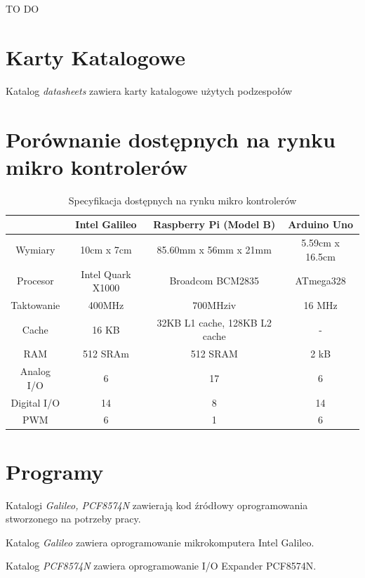 \documentclass{xmgr}
\begin{document}
\summary
TO DO

\appendix
\chapter{Karty Katalogowe}
Katalog \emph{datasheets} zawiera karty katalogowe użytych podzespołów
\chapter{Porównanie dostępnych na rynku mikro kontrolerów}
\begin{table}[!tbh]
\begin{tabular}{|c|c|c|c|} \hline
 & Intel Galileo & Raspberry Pi (Model B) & Arduino Uno \\ \hline
Wymiary & 10cm x 7cm  & 85.60mm x 56mm x 21mm & 5.59cm x 16.5cm \\ \hline
Procesor & Intel Quark X1000 & Broadcom BCM2835 & ATmega328 \\ \hline
Taktowanie &	400MHz	& 700MHziv & 16 MHz\\ \hline
Cache &	16 KB & 32KB L1 cache, 128KB L2 cache & - \\ \hline
RAM &	512 SRAm & 512 SRAM & 2 kB \\ \hline
Analog I/O	& 6 & 17 & 6 \\ \hline
Digital I/O	& 14 & 8 & 14 \\ \hline
PWM	& 6 & 1 & 6 \\ \hline
\end{tabular}
\caption{Specyfikacja dostępnych na rynku mikro kontrolerów}
\end{table}
\chapter{Programy}
Katalogi \emph{Galileo, PCF8574N} zawierają kod źródłowy oprogramowania stworzonego na potrzeby pracy. 

\noindent Katalog \emph{Galileo} zawiera oprogramowanie mikrokomputera Intel\cite{einstein} Galileo.

\noindent Katalog \emph{PCF8574N} zawiera oprogramowanie I/O Expander PCF8574N.




\listoftables

\listoffigures

\oswiadczenie
\end{document}
